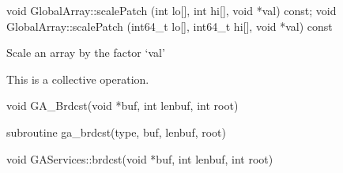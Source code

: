 \documentclass[12pt]{article}
\begin{document}
\begin{cxxapi}
\begin{cxxcode}
void GlobalArray::scalePatch (int lo[], int hi[], void *val) const;
void GlobalArray::scalePatch (int64_t lo[], int64_t hi[], void *val) const
\end{cxxcode}
\begin{funcargs}
\end{funcargs}
\end{cxxapi}
\gcoll

\begin{desc}

Scale an array by the factor `val'

This is a collective operation.
\end{desc}


\begin{capi}
\begin{ccode}
void GA_Brdcst(void *buf, int lenbuf, int root)
\end{ccode}
\begin{funcargs}
\end{funcargs}
\end{capi}

\begin{fapi}
\begin{fcode}
subroutine ga_brdcst(type, buf, lenbuf, root)
\end{fcode}
\begin{funcargs}
\end{funcargs}
\end{fapi}

\begin{cxxapi}
\begin{cxxcode}
void GAServices::brdcst(void *buf, int lenbuf, int root)
\end{cxxcode}
\begin{funcargs}
\end{funcargs}
\end{cxxapi}
\end{document}
